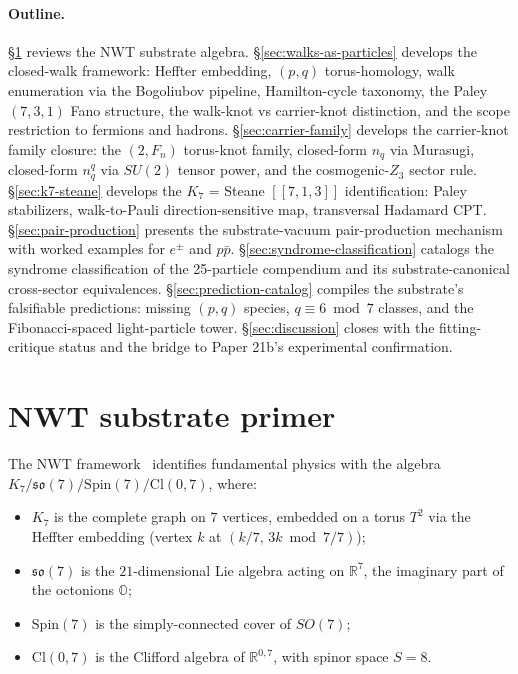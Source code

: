\documentclass[11pt]{article}
\newcommand{\so}{\mathfrak{so}}
\newcommand{\Klogical}{[[7, 1, 3]]}
\begin{document}
\paragraph{Outline.}
\S\ref{sec:substrate-primer} reviews the NWT substrate algebra.  \S\ref{sec:walks-as-particles} develops the closed-walk framework: Heffter embedding, $(p, q)$ torus-homology, walk enumeration via the Bogoliubov pipeline, Hamilton-cycle taxonomy, the Paley $(7, 3, 1)$ Fano structure, the walk-knot vs carrier-knot distinction, and the scope restriction to fermions and hadrons.  \S\ref{sec:carrier-family} develops the carrier-knot family closure: the $(2, F_n)$ torus-knot family, closed-form $n_q$ via Murasugi, closed-form $n_q^q$ via $SU(2)$ tensor power, and the cosmogenic-$Z_3$ sector rule.  \S\ref{sec:k7-steane} develops the $K_7$ = Steane $\Klogical$ identification: Paley stabilizers, walk-to-Pauli direction-sensitive map, transversal Hadamard CPT.  \S\ref{sec:pair-production} presents the substrate-vacuum pair-production mechanism with worked examples for $e^\pm$ and $p\bar p$.  \S\ref{sec:syndrome-classification} catalogs the syndrome classification of the 25-particle compendium and its substrate-canonical cross-sector equivalences.  \S\ref{sec:prediction-catalog} compiles the substrate's falsifiable predictions: missing $(p, q)$ species, $q \equiv 6 \bmod 7$ classes, and the Fibonacci-spaced light-particle tower.  \S\ref{sec:discussion} closes with the fitting-critique status and the bridge to Paper 21b's experimental confirmation.

\section{NWT substrate primer}
\label{sec:substrate-primer}

The NWT framework~\cite{Paper8a,Paper17,Paper18,Paper19,Paper20} identifies fundamental physics with the algebra $K_7 /\allowbreak \so(7) /\allowbreak \mathrm{Spin}(7) /\allowbreak \mathrm{Cl}(0, 7)$, where:
\begin{itemize}
\item $K_7$ is the complete graph on $7$ vertices, embedded on a torus $T^2$ via the Heffter embedding (vertex $k$ at $(k/7,\, 3k \bmod 7 / 7)$);
\item $\so(7)$ is the $21$-dimensional Lie algebra acting on $\mathbb{R}^7$, the imaginary part of the octonions $\mathbb{O}$;
\item $\mathrm{Spin}(7)$ is the simply-connected cover of $SO(7)$;
\item $\mathrm{Cl}(0, 7)$ is the Clifford algebra of $\mathbb{R}^{0, 7}$, with spinor space $S = 8$.
\end{itemize}
\end{document}
